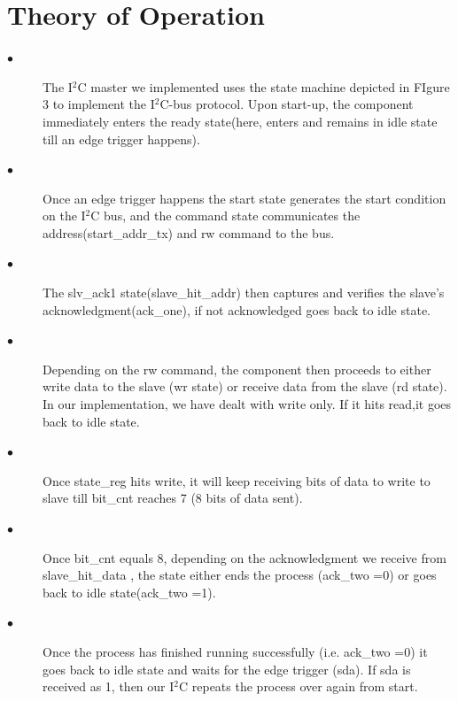 \documentclass[12pt,twocolumn]{IEEEtran}
\begin{document}
  \section{Theory of Operation}
    \begin{description}
     
     \item[$\bullet$] The I$^{2}$C master we implemented uses the state machine depicted in FIgure 3 to implement the I$^{2}$C-bus protocol. Upon start-up, the component immediately enters the ready state(here, enters and remains in idle state till an edge trigger happens). 

     \item[$\bullet$] Once an edge trigger happens the start state generates the start condition on the I$^{2}$C bus, and the command state communicates the address(start\_addr\_tx) and rw command to the bus. 

    \item[$\bullet$] The slv\_ack1 state(slave\_hit\_addr) then captures and verifies the slave’s acknowledgment(ack\_one), if not acknowledged goes back to idle state. 

    \item[$\bullet$]Depending on the rw command, the component then proceeds to either write data to the slave (wr state) or receive data from the slave (rd state). 
    In our implementation, we have dealt with write only. If it hits read,it goes back to idle state.

    \item[$\bullet$] Once state\_reg hits write, it will keep receiving bits of data to write to slave till bit\_cnt reaches 7 (8 bits of data sent).

    \item[$\bullet$] Once bit\_cnt equals 8, depending on the acknowledgment we receive from slave\_hit\_data , the state either ends the process (ack\_two =0) or goes back 
    to idle state(ack\_two =1). 

    \item[$\bullet$] Once the process has finished running successfully (i.e. ack\_two =0) it goes back to idle state and waits for the edge trigger (sda). If sda is received 
    as 1, then our I$^{2}$C repeats the process over again from start.
    \end{description}
  
\end{document}
